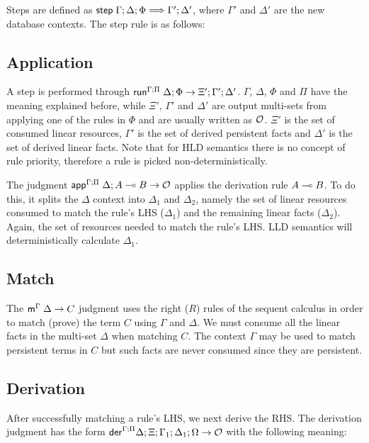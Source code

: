 Steps are defined as $\mathsf{step} \; \Gamma; \Delta; \Phi \Longrightarrow \Gamma';
\Delta'$, where $\Gamma'$ and $\Delta'$ are the new database contexts. The step
rule is as follows:



\subsection{Application}

A step is performed through
$\mathsf{run}^{\Gamma ; \Pi} \; \Delta ; \Phi \rightarrow \Xi' ; \Gamma'; \Delta'$.  $\Gamma$, $\Delta$,
$\Phi$ and $\Pi$ have the meaning explained before, while $\Xi'$, $\Gamma'$ and
$\Delta'$ are output multi-sets from applying one of the rules in $\Phi$ and are
usually written as $\mathcal{O}$. $\Xi'$ is the set of consumed linear resources,
$\Gamma'$ is the set of derived persistent facts and $\Delta'$ is the set of
derived linear facts.  Note that for HLD semantics there is no concept of rule
priority, therefore a rule is picked non-deterministically.

The judgment $\mathsf{app}^{\Gamma ; \Pi} \; \Delta ; A \multimap B \rightarrow \mathcal{O}$ applies the
derivation rule $A \multimap B$. To do this, it splits the $\Delta$ context into
$\Delta_1$ and $\Delta_2$, namely the set of linear resources consumed to match
the rule's LHS ($\Delta_1$) and the remaining linear facts ($\Delta_2$).  Again,
the set of resources needed to match the rule's LHS. LLD semantics will
deterministically calculate $\Delta_1$.



\subsection{Match}

The $\mathsf{m}^{\Gamma} \; \Delta \rightarrow C$ judgment uses the right ($R$) rules of the sequent
calculus in order to match (prove) the term $C$ using $\Gamma$ and $\Delta$. We
must consume all the linear facts in the multi-set $\Delta$ when matching $C$.
The context $\Gamma$ may be used to match persistent terms in $C$ but such facts
are never consumed since they are persistent.



\subsection{Derivation}

After successfully matching a rule's LHS, we next derive the RHS.  The
derivation judgment has the form
$\mathsf{der}^{\Gamma ; \Pi} \Delta ; \Xi; \Gamma_1; \Delta_1; \Omega \rightarrow \mathcal{O}$ with the
following meaning:

